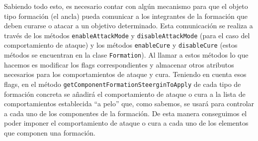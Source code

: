 Sabiendo todo esto, es necesario contar con algún mecanismo para que el objeto tipo formación (el ancla) pueda comunicar a los integrantes de la formación que deben curarse o atacar a un objetivo determinado. Esta comunicación se realiza a través de los métodos \texttt{enableAttackMode} y \texttt{disableAttackMode} (para el caso del comportamiento de ataque) y los métodos \texttt{enableCure} y \texttt{disableCure} (estos métodos se encuentran en la clase \texttt{Formation}). Al llamar a estos métodos lo que hacemos es modificar los flags correspondientes y almacenar otros atributos necesarios para los comportamientos de ataque y cura. Teniendo en cuenta esos flags, en el método \texttt{getComponentFormationSteerginToApply} de cada tipo de formación concreta se añadirá el comportamiento de ataque o cura a la lista de comportamientos establecida ``a pelo'' que, como sabemos, se usará para controlar a cada uno de los componentes de la formación. De esta manera conseguimos el poder imponer el comportamiento de ataque o cura a cada uno de los elementos que componen una formación.

